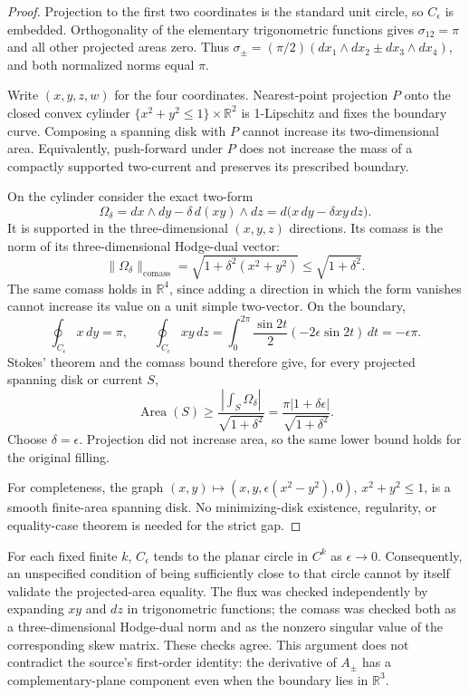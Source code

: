 \begin{proof}
Projection to the first two coordinates is the standard unit circle, so
\(C_\epsilon\) is embedded.  Orthogonality of the elementary trigonometric
functions gives \(\sigma_{12}=\pi\) and all other projected areas zero.
Thus \(\sigma_\pm=(\pi/2)(dx_1\wedge dx_2\pm dx_3\wedge dx_4)\),
and both normalized norms equal \(\pi\).

Write \((x,y,z,w)\) for the four coordinates.  Nearest-point projection
\(P\) onto the closed convex cylinder
\(\{x^2+y^2\le1\}\times\mathbb R^2\) is 1-Lipschitz and fixes the
boundary curve.  Composing a spanning disk with \(P\) cannot increase
its two-dimensional area.  Equivalently, push-forward under \(P\)
does not increase the mass of a compactly supported two-current and
preserves its prescribed boundary.

On the cylinder consider the exact two-form
\[
\Omega_\delta=dx\wedge dy-\delta\,d(xy)\wedge dz
             =d\bigl(x\,dy-\delta xy\,dz\bigr).
\]
It is supported in the three-dimensional \((x,y,z)\) directions.  Its
comass is the norm of its three-dimensional Hodge-dual vector:
\[
\|\Omega_\delta\|_{\mathrm{comass}}
 =\sqrt{1+\delta^2(x^2+y^2)}\le\sqrt{1+\delta^2}.
\]
The same comass holds in \(\mathbb R^4\), since adding a direction in
which the form vanishes cannot increase its value on a unit simple
two-vector.  On the boundary,
\[
\oint_{C_\epsilon}x\,dy=\pi,\qquad
\oint_{C_\epsilon}xy\,dz
 =\int_0^{2\pi}\frac{\sin2t}{2}(-2\epsilon\sin2t)\,dt
 =-\epsilon\pi.
\]
Stokes' theorem and the comass bound therefore give, for every projected
spanning disk or current \(S\),
\[
\operatorname{Area}(S)\ge
\frac{\left|\int_S\Omega_\delta\right|}{\sqrt{1+\delta^2}}
=\frac{\pi|1+\delta\epsilon|}{\sqrt{1+\delta^2}}.
\]
Choose \(\delta=\epsilon\).  Projection did not increase area, so the
same lower bound holds for the original filling.

For completeness, the graph
\((x,y)\mapsto(x,y,\epsilon(x^2-y^2),0)\), \(x^2+y^2\le1\),
is a smooth finite-area spanning disk.  No minimizing-disk existence,
regularity, or equality-case theorem is needed for the strict gap.
\end{proof}

\begin{remark}\ours{}
For each fixed finite \(k\), \(C_\epsilon\) tends to the planar circle
in \(C^k\) as \(\epsilon\to0\).  Consequently, an unspecified condition
of being sufficiently close to that circle cannot by itself validate the
projected-area equality.  The flux was checked independently by expanding
\(xy\) and \(dz\) in trigonometric functions; the comass was checked
both as a three-dimensional Hodge-dual norm and as the nonzero singular
value of the corresponding skew matrix.  These checks agree.
This argument does not contradict the source's first-order identity:
the derivative of \(A_\pm\) has a complementary-plane component even
when the boundary lies in \(\mathbb R^3\).
\end{remark}


